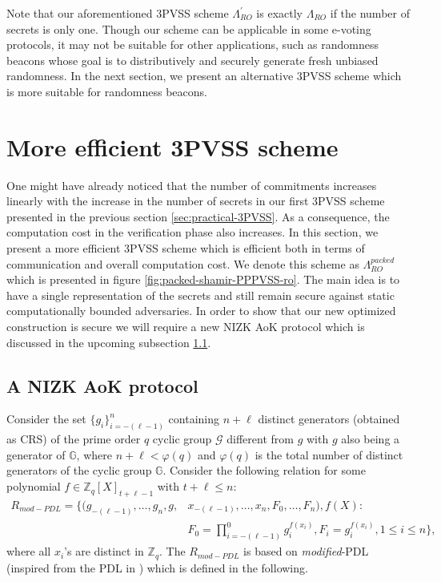 Note that our aforementioned 3PVSS scheme $\Lambda_{RO}^{'}$ is exactly $\Lambda_{RO}$ if 
the number of secrets is only one. Though our scheme can be applicable in some 
e-voting protocols, it may not be suitable for other applications, such as randomness 
beacons whose goal is to distributively and securely generate fresh unbiased randomness. 
In the next section, we present an alternative 3PVSS scheme which is more 
suitable for randomness beacons.


\vspace{-1em}

\vspace{-1em}
\section{More efficient 3PVSS scheme}
\label{sec:efficient-3PVSS}

One might have already noticed that the number of commitments increases linearly with 
the increase in the number of secrets in our first 3PVSS scheme presented in the previous 
section \ref{sec:practical-3PVSS}. As a consequence, the computation cost in the 
verification phase also increases. In this section, we present a more efficient 
3PVSS scheme which is efficient both in terms of communication and overall computation 
cost. We denote this scheme as $\Lambda_{RO}^{packed}$ which is presented in figure 
\ref{fig:packed-shamir-PPPVSS-ro}. The main idea is to have a single representation of 
the secrets and still remain secure against static computationally bounded adversaries. 
In order to show that our new optimized construction is secure we will require a new 
NIZK AoK protocol which is discussed in the upcoming subsection \ref{subsec:aok_polynomial_dl}.

\subsection{A NIZK AoK protocol}
\label{subsec:aok_polynomial_dl}
Consider the set $\{g_i\}_{i=-(\ell-1)}^n$ containing $n+\ell$ distinct generators (obtained as CRS) of 
the prime order $q$ cyclic group $\mathcal{G}$ different from $g$ with $g$ also being a generator of 
$\mathbb{G}$, where $n+\ell<\varphi(q)$ and $\varphi(q)$ is
the total number of distinct generators of the cyclic group $\mathbb{G}$. Consider the following relation for 
some polynomial $f\in\mathbb{Z}_q[X]_{t+\ell-1}$ with $t+\ell\leq n$:
\begin{align}\label{eq:relation_mod_PDL}
  R_{mod-PDL} = \{(g_{-(\ell-1)},\dots,g_n,g,&x_{-(\ell-1)},\dots,x_n,F_0,\dots,F_n),f(X) :\nonumber\\
   &F_0=\prod_{i=-(\ell-1)}^{0}g_i^{f(x_i)}, F_i=g_i^{f(x_i)}, 1\leq i\leq n\},
\end{align}
where all $x_i$'s are distinct in $\mathbb{Z}_q$. The $R_{mod-PDL}$ is based on \textit{modified}-PDL 
(inspired from the PDL in \cite{cryptoeprint:2023/1669}) which is defined in the following.


